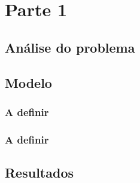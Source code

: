 \chapter{Parte 1}
\label{cap:p1}

\section{Análise do problema}


\newpage
\section{Modelo}

\subsection{A definir}


\subsection{A definir} 


\newpage

\section{Resultados}



